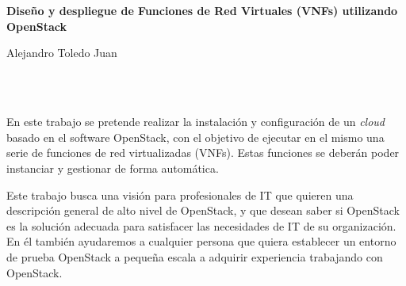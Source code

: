 \chapter*{}






\cleardoublepage
\thispagestyle{empty}

\begin{center}
{\large\bfseries Diseño y despliegue de Funciones de Red Virtuales (VNFs) utilizando OpenStack}\\
\end{center}
\begin{center}
Alejandro Toledo Juan\\
\end{center}

\\

\vspace{0.7cm}
\\


En este trabajo se pretende realizar la instalación y configuración de un \textit{cloud} basado en el software OpenStack, con el objetivo de ejecutar en el mismo una serie de funciones de red virtualizadas (VNFs). Estas funciones se deberán poder instanciar y gestionar de forma automática.


Este trabajo busca una visión para profesionales de IT que quieren una descripción general de alto nivel de OpenStack, y que desean saber si OpenStack es la solución adecuada para satisfacer las necesidades de IT de su organización. En él también ayudaremos a cualquier persona que quiera establecer un entorno de prueba OpenStack a pequeña escala a adquirir experiencia trabajando con OpenStack.

